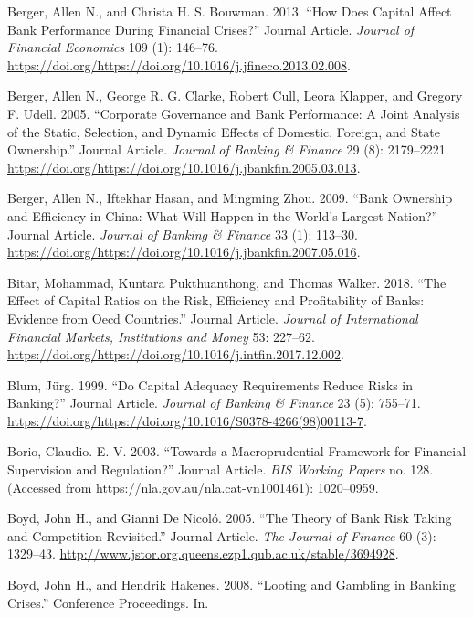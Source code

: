 \documentclass{article}
\begin{document}
\leavevmode\hypertarget{ref-RN24}{}%
Berger, Allen N., and Christa H. S. Bouwman. 2013. ``How Does Capital
Affect Bank Performance During Financial Crises?'' Journal Article.
\emph{Journal of Financial Economics} 109 (1): 146--76.
\url{https://doi.org/https://doi.org/10.1016/j.jfineco.2013.02.008}.

\leavevmode\hypertarget{ref-RN25}{}%
Berger, Allen N., George R. G. Clarke, Robert Cull, Leora Klapper, and
Gregory F. Udell. 2005. ``Corporate Governance and Bank Performance: A
Joint Analysis of the Static, Selection, and Dynamic Effects of
Domestic, Foreign, and State Ownership.'' Journal Article. \emph{Journal
of Banking \& Finance} 29 (8): 2179--2221.
\url{https://doi.org/https://doi.org/10.1016/j.jbankfin.2005.03.013}.

\leavevmode\hypertarget{ref-RN26}{}%
Berger, Allen N., Iftekhar Hasan, and Mingming Zhou. 2009. ``Bank
Ownership and Efficiency in China: What Will Happen in the World's
Largest Nation?'' Journal Article. \emph{Journal of Banking \& Finance}
33 (1): 113--30.
\url{https://doi.org/https://doi.org/10.1016/j.jbankfin.2007.05.016}.

\leavevmode\hypertarget{ref-RN28}{}%
Bitar, Mohammad, Kuntara Pukthuanthong, and Thomas Walker. 2018. ``The
Effect of Capital Ratios on the Risk, Efficiency and Profitability of
Banks: Evidence from Oecd Countries.'' Journal Article. \emph{Journal of
International Financial Markets, Institutions and Money} 53: 227--62.
\url{https://doi.org/https://doi.org/10.1016/j.intfin.2017.12.002}.

\leavevmode\hypertarget{ref-RN29}{}%
Blum, Jürg. 1999. ``Do Capital Adequacy Requirements Reduce Risks in
Banking?'' Journal Article. \emph{Journal of Banking \& Finance} 23 (5):
755--71.
\url{https://doi.org/https://doi.org/10.1016/S0378-4266(98)00113-7}.

\leavevmode\hypertarget{ref-RN30}{}%
Borio, Claudio. E. V. 2003. ``Towards a Macroprudential Framework for
Financial Supervision and Regulation?'' Journal Article. \emph{BIS
Working Papers} no. 128. (Accessed from
https://nla.gov.au/nla.cat-vn1001461): 1020--0959.

\leavevmode\hypertarget{ref-RN32}{}%
Boyd, John H., and Gianni De Nicoló. 2005. ``The Theory of Bank Risk
Taking and Competition Revisited.'' Journal Article. \emph{The Journal
of Finance} 60 (3): 1329--43.
\url{http://www.jstor.org.queens.ezp1.qub.ac.uk/stable/3694928}.

\leavevmode\hypertarget{ref-RN31}{}%
Boyd, John H., and Hendrik Hakenes. 2008. ``Looting and Gambling in
Banking Crises.'' Conference Proceedings. In.
\end{document}
